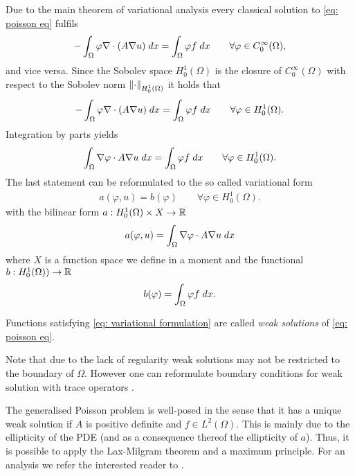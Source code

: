 Due to the main theorem of variational analysis every classical solution to \eqref{eq: poisson eq} fulfils 
\begin{align*}
	-\int_{\Omega} {{\varphi \nabla \cdot (A \nabla u)}\;dx}=
	 \int_{\Omega} {{\varphi f}\;dx} \qquad \forall \varphi \in C_0^\infty(\Omega),
\end{align*}
and vice versa. Since the Sobolev space $H_0^1(\Omega)$ is the closure of $C_0^\infty(\Omega)$ with respect to the Sobolev norm $\left\lVert \cdot \right\rVert _{H_0^1(\Omega)}$ it holds that
\begin{align}
	-\int_{\Omega} {{\varphi \nabla \cdot (A \nabla u)}\;dx}=
	 \int_{\Omega} {{\varphi f}\;dx} \qquad \forall \varphi \in H_0^1(\Omega). \label{eq: variational form}
\end{align}
Integration by parts yields
\begin{align*}
	\myIntX \Omega {\nabla \varphi  \cdot A\nabla u}
	= \myIntX  \Omega { \varphi f } \qquad \forall \varphi \in H_0^1(\Omega). %
\end{align*}
The last statement can be reformulated to the so called variational form 
\begin{align}
a(\varphi,u)  = b(\varphi) \qquad \forall \varphi \in H_0^1(\Omega). \label{eq: variational formulation}
\end{align}
with the bilinear form $a:H_0^1(\Omega) \times X \rightarrow \mathbb{R}$
\begin{align*}
a(\varphi,u) = \int_{\Omega} {{ \nabla \varphi  \cdot A\nabla u }\;dx}
\end{align*}
where $X$ is a function space we define in a moment and the functional $b:H_0^1(\Omega)) \rightarrow \mathbb{R}$
\begin{align*}
 b(\varphi)  = \int_{\Omega} {{ \varphi f}\;dx}.
\end{align*}


\begin{definition}
	Functions satisfying \eqref{eq: variational formulation} are called \emph{weak solutions} of \eqref{eq: poisson eq}.
\end{definition}
Note that due to the lack of regularity weak solutions may not be restricted to the boundary of $\Omega$. However one can reformulate boundary conditions for weak solution with trace operators \cite[Section 5.5]{Evans1998}.

The generalised Poisson problem is well-posed in the sense that it has a unique weak solution if $A$ is positive definite and $f\in L^2(\Omega)$. This is mainly due to the ellipticity of the PDE (and as a consequence thereof the ellipticity of $a$). Thus, it is possible to apply the Lax-Milgram theorem and a maximum principle. For an analysis we refer the interested reader to \cite[Chapter~6]{Evans1998}.


